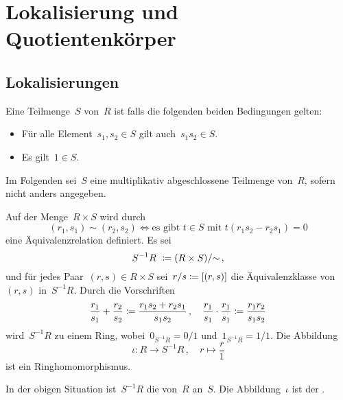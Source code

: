 \clearpage





\section{Lokalisierung und Quotientenkörper}



\subsection{Lokalisierungen}

\begin{definition}
  Eine Teilmenge~$S$ von~$R$ ist  falls die folgenden beiden Bedingungen gelten:
  \begin{itemize}
    \item
      Für alle Element~$s_1, s_2 \in S$ gilt auch~$s_1 s_2 \in S$.
    \item
      Es gilt~$1 \in S$.
  \end{itemize}
\end{definition}

\begin{convention}
  Im Folgenden sei~$S$ eine multiplikativ abgeschlossene Teilmenge von~$R$, sofern nicht anders angegeben.
\end{convention}

Auf der Menge~$R \times S$ wird durch
\[
  (r_1, s_1) \sim (r_2, s_2)
  \iff
  \text{es gibt~$t \in S$ mit~$t(r_1 s_2 - r_2 s_1) = 0$}
\]
eine Äquivalenzrelation definiert.
Es sei
\[
  S^{-1} R \defined (R \times S) / {\sim} \,,
\]
und für jedes Paar~$(r,s) \in R \times S$ sei~$r/s \coloneqq [(r,s)]$ die Äquivalenzklasse von~$(r,s)$ in~$S^{-1} R$.
Durch die Vorschriften
\[
  \frac{r_1}{s_1} + \frac{r_2}{s_2}
  \coloneqq
  \frac{r_1 s_2 + r_2 s_1}{s_1 s_2} \,,
  \quad
  \frac{r_1}{s_1} \cdot \frac{r_1}{s_1}
  \coloneqq
  \frac{r_1 r_2}{s_1 s_2}
\]
wird~$S^{-1} R$ zu einem Ring, wobei~$0_{S^{-1} R} = 0/1$ und~$1_{S^{-1} R} = 1/1$.
Die Abbildung
\[
  \iota
  \colon
  R \to S^{-1} R \,,
  \quad
  r \mapsto \frac{r}{1}
\]
ist ein Ringhomomorphismus.

\begin{definition}
  In der obigen Situation ist~$S^{-1} R$ die  von~$R$ an~$S$.
  Die Abbildung~$\iota$ ist der .
\end{definition}

